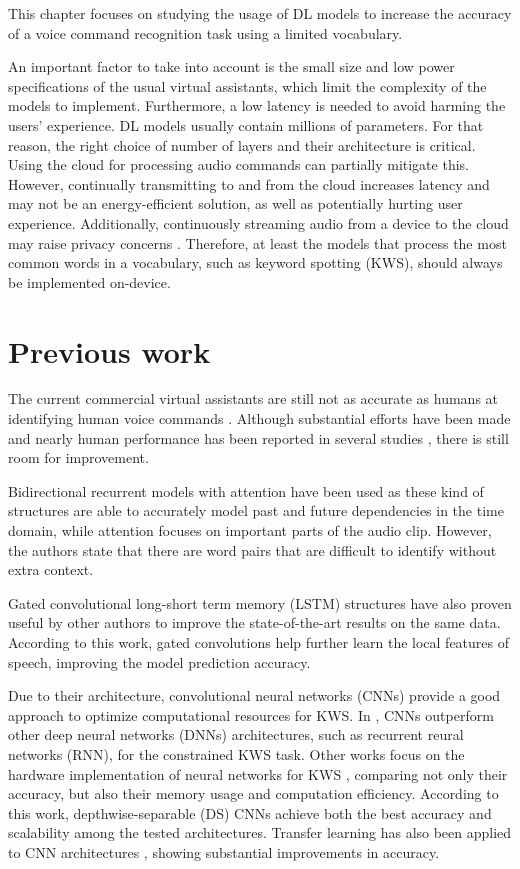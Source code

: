 This chapter focuses on studying the usage of DL models to increase the accuracy of a voice command recognition task using a limited vocabulary.

An important factor to take into account is the small size and low power specifications of the usual virtual assistants, which limit the complexity of the models to implement. Furthermore, a low latency is needed to avoid harming the users' experience. DL models usually contain millions of parameters. For that reason, the right choice of number of layers and their architecture is critical. Using the cloud for processing audio commands can partially mitigate this. However, continually transmitting to and from the cloud increases latency and may not be an energy-efficient solution, as well as potentially hurting user experience. Additionally, continuously streaming audio from a device to the cloud may raise privacy concerns \autocite{iqabal2022}. Therefore, at least the models that process the most common words in a vocabulary, such as keyword spotting (KWS), should always be implemented on-device.

\section{Previous work}
The current commercial virtual assistants are still not as accurate as humans at identifying human voice commands \autocite{Michaely2017}. Although substantial efforts have been made and nearly human performance has been reported in several studies \autocite{Andrade2018, Zhang2017, Mcmahan2017, Warden2018}, there is still room for improvement. 

Bidirectional recurrent models with attention have been used \autocite{Andrade2018} as these kind of structures are able to accurately model past and future dependencies in the time domain, while attention focuses on important parts of the audio clip. However, the authors state that there are word pairs that are difficult to identify without extra context.

Gated convolutional long-short term memory (LSTM) structures have also proven useful by other authors \autocite{Wang2018} to improve the state-of-the-art results on the same data. According to this work, gated convolutions help further learn the local features of speech, improving the model prediction accuracy.

Due to their architecture, convolutional neural networks (CNNs) provide a good approach to optimize computational resources for KWS. In \autocite{Tara2015}, CNNs outperform other deep neural networks (DNNs) architectures, such as recurrent reural networks (RNN), for the constrained KWS task. Other works focus on the hardware implementation of neural networks for KWS \autocite{Zhang2017}, comparing not only their accuracy, but also their memory usage and computation efficiency. According to this work, depthwise-separable (DS) CNNs achieve both the best accuracy and scalability among the tested architectures.  Transfer learning has also been applied to CNN architectures \autocite{Mcmahan2017}, showing substantial improvements in accuracy.

